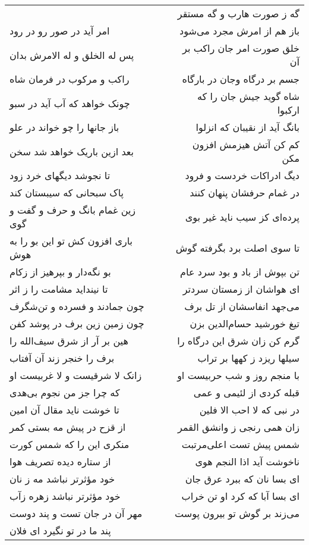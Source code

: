 \begin{center}
\begin{longtable}{l p{0.5cm} r}
&&
گه ز صورت هارب و گه مستقر
\\
امر آید در صور رو در رود
&&
باز هم از امرش مجرد می‌شود
\\
پس له الخلق و له الامرش بدان
&&
خلق صورت امر جان راکب بر آن
\\
راکب و مرکوب در فرمان شاه
&&
جسم بر درگاه وجان در بارگاه
\\
چونک خواهد که آب آید در سبو
&&
شاه گوید جیش جان را که ارکبوا
\\
باز جانها را چو خواند در علو
&&
بانگ آید از نقیبان که انزلوا
\\
بعد ازین باریک خواهد شد سخن
&&
کم کن آتش هیزمش افزون مکن
\\
تا نجوشد دیگهای خرد زود
&&
دیگ ادراکات خردست و فرود
\\
پاک سبحانی که سیبستان کند
&&
در غمام حرفشان پنهان کنند
\\
زین غمام بانگ و حرف و گفت و گوی
&&
پرده‌ای کز سیب ناید غیر بوی
\\
باری افزون کش تو این بو را به هوش
&&
تا سوی اصلت برد بگرفته گوش
\\
بو نگه‌دار و بپرهیز از زکام
&&
تن بپوش از باد و بود سرد عام
\\
تا نینداید مشامت را ز اثر
&&
ای هواشان از زمستان سردتر
\\
چون جمادند و فسرده و تن‌شگرف
&&
می‌جهد انفاسشان از تل برف
\\
چون زمین زین برف در پوشد کفن
&&
تیغ خورشید حسام‌الدین بزن
\\
هین بر آر از شرق سیف‌الله را
&&
گرم کن زان شرق این درگاه را
\\
برف را خنجر زند آن آفتاب
&&
سیلها ریزد ز کهها بر تراب
\\
زانک لا شرقیست و لا غربیست او
&&
با منجم روز و شب حربیست او
\\
که چرا جز من نجوم بی‌هدی
&&
قبله کردی از لئیمی و عمی
\\
تا خوشت ناید مقال آن امین
&&
در نبی که لا احب الا فلین
\\
از قزح در پیش مه بستی کمر
&&
زان همی رنجی ز وانشق القمر
\\
منکری این را که شمس کورت
&&
شمس پیش تست اعلی‌مرتبت
\\
از ستاره دیده تصریف هوا
&&
ناخوشت آید اذا النجم هوی
\\
خود مؤثرتر نباشد مه ز نان
&&
ای بسا نان که ببرد عرق جان
\\
خود مؤثرتر نباشد زهره زآب
&&
ای بسا آبا که کرد او تن خراب
\\
مهر آن در جان تست و پند دوست
&&
می‌زند بر گوش تو بیرون پوست
\\
پند ما در تو نگیرد ای فلان

\end{longtable}
\end{center}
